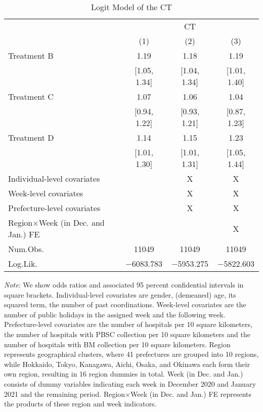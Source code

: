 \documentclass[12pt, a4paper]{article}
\begin{document}
\begin{table}[H]

\caption{\label{tab:test-logit}Logit Model of the CT}
\centering
\fontsize{8}{10}\selectfont
\begin{threeparttable}
\begin{tabular}[t]{lccc}
\toprule
\multicolumn{1}{c}{ } & \multicolumn{3}{c}{CT} \\
\cmidrule(l{3pt}r{3pt}){2-4}
  & (1) & (2) & (3)\\
\midrule
Treatment B & \num{1.19} & \num{1.18} & \num{1.19}\\
 & {}[\num{1.05}, \num{1.34}] & {}[\num{1.04}, \num{1.34}] & {}[\num{1.01}, \num{1.40}]\\
Treatment C & \num{1.07} & \num{1.06} & \num{1.04}\\
 & {}[\num{0.94}, \num{1.22}] & {}[\num{0.93}, \num{1.21}] & {}[\num{0.87}, \num{1.23}]\\
Treatment D & \num{1.14} & \num{1.15} & \num{1.23}\\
 & {}[\num{1.01}, \num{1.30}] & {}[\num{1.01}, \num{1.31}] & {}[\num{1.05}, \num{1.44}]\\
\midrule
Individual-level covariates &  & X & X\\
Week-level covariates &  & X & X\\
Prefecture-level covariates &  & X & X\\
Region$\times$Week (in Dec. and Jan.) FE &  &  & X\\
Num.Obs. & \num{11049} & \num{11049} & \num{11049}\\
Log.Lik. & \num{-6083.783} & \num{-5953.275} & \num{-5822.603}\\
\bottomrule
\end{tabular}
\begin{tablenotes}
\item \emph{Note}: We show odds ratios and associated 95 percent confidential intervals in square brackets. Individual-level covariates are gender, (demeaned) age, its squared term, the number of past coordinations. Week-level covariates are the number of public holidays in the assigned week and the following week. Prefecture-level covariates are the number of hospitals per 10 square kilometers, the number of hospitals with PBSC collection per 10 square kilometers and the number of hospitals with BM collection per 10 square kilometers. Region represents geographical clusters, where 41 prefectures are grouped into 10 regions, while Hokkaido, Tokyo, Kanagawa, Aichi, Osaka, and Okinawa each form their own region, resulting in 16 region dummies in total. Week (in Dec. and Jan.) consists of dummy variables indicating each week in December 2020 and January 2021 and the remaining period. Region$\times$Week (in Dec. and Jan.) FE represents the products of these region and week indicators.
\end{tablenotes}
\end{threeparttable}
\end{table}
\end{document}
